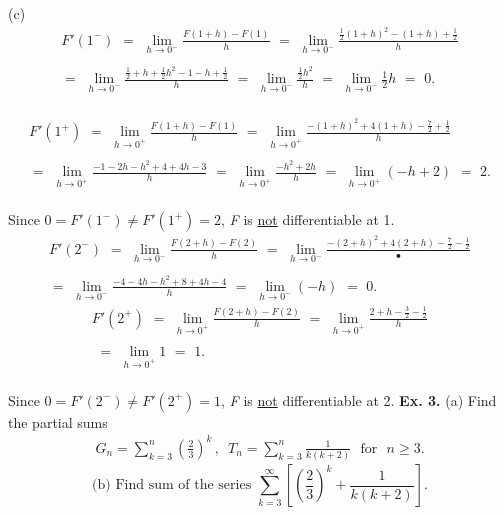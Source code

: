 \documentclass[a4paper, 12pt]{article}
\begin{document}
(c)\\
\begin{align*}
F'(1^-) \,\, = \,\, \lim_{h \to 0^-} \frac{F(1 + h) - F(1)}{h}
\,\, = \,\, \lim_{h \to 0^-} \frac{\frac{1}{2}(1 + h)^2 - (1 + h) + \frac{1}{2}}{h} \\\\ 
= \,\, \lim_{h \to 0^-} \frac{\frac{1}{2} + h + \frac{1}{2}h^2 - 1 - h + \frac{1}{2}}{h}
\,\, = \,\, \lim_{h \to 0^-} \frac{\frac{1}{2}h^2}{h}
\,\, = \,\, \lim_{h \to 0^-} \frac{1}{2}h \,\, = \,\, 0.
\end{align*}\\
\begin{align*}
F'(1^+) \,\, = \,\, \lim_{h \to 0^+} \frac{F(1 + h) - F(1)}{h}
\,\, = \,\, \lim_{h \to 0^+} \frac{-(1 + h)^2 + 4(1 + h) - \frac{7}{2} + \frac{1}{2}}{h} \\\\
= \,\, \lim_{h \to 0^+} \frac{-1 - 2h - h^2 + 4 + 4h - 3}{h}
\,\, = \,\, \lim_{h \to 0^+} \frac{-h^2 + 2h}{h} 
\,\, = \,\, \lim_{h \to 0^+} (-h + 2) \,\, = \,\, 2.
\end{align*}\\
Since $0 = F'(1^-) \not = F'(1^+) = 2$, \emph{F} is \underline{not} differentiable at 1.
\bigbreak
\begin{align*}
F'(2^-) \,\, = \,\, \lim_{h \to 0^-} \frac{F(2 + h) - F(2)}{h}
\,\, = \,\, \lim_{h \to 0^-} \frac{-(2 + h)^2 + 4(2 + h) - \frac{7}{2} - \frac{1}{2}}{•} \\\\
= \,\, \lim_{h \to 0^-} \frac{-4 - 4h - h^2 + 8 + 4h - 4}{h}
\,\, = \,\, \lim_{h \to 0^-} (-h) \,\, = \,\, 0.
\end{align*}
\begin{align*}
F'(2^+) \,\, = \,\, \lim_{h \to 0^+} \frac{F(2 + h) - F(2)}{h}
\,\, = \,\, \lim_{h \to 0^+} \frac{2 + h - \frac{3}{2} - \frac{1}{2}}{h} \\\\
\,\, = \,\, \lim_{h \to 0^+} 1 \,\, = \,\, 1.
\end{align*}\\
Since $0 = F'(2^-) \not = F'(2^+) = 1$, \emph{F} is \underline{not} differentiable at 2.
\bigbreak
\bigbreak
\textbf{Ex. 3.} (a) Find the partial sums
\begin{align*}
G_n = \sum_{k=3}^{n} (\frac{2}{3})^k \, , \,\,\, T_n = \sum_{k=3}^{n} \frac{1}{k(k+2)} \,\,\,\, \text{for} \,\,\,\, n \geq 3.
\end{align*} 
\begin{equation*}
\text{(b) Find sum of the series} \,\, \sum_{k=3}^{\infty} \left[(\frac{2}{3})^k + \frac{1}{k(k+2)}\right].
\end{equation*}
\end{document}
